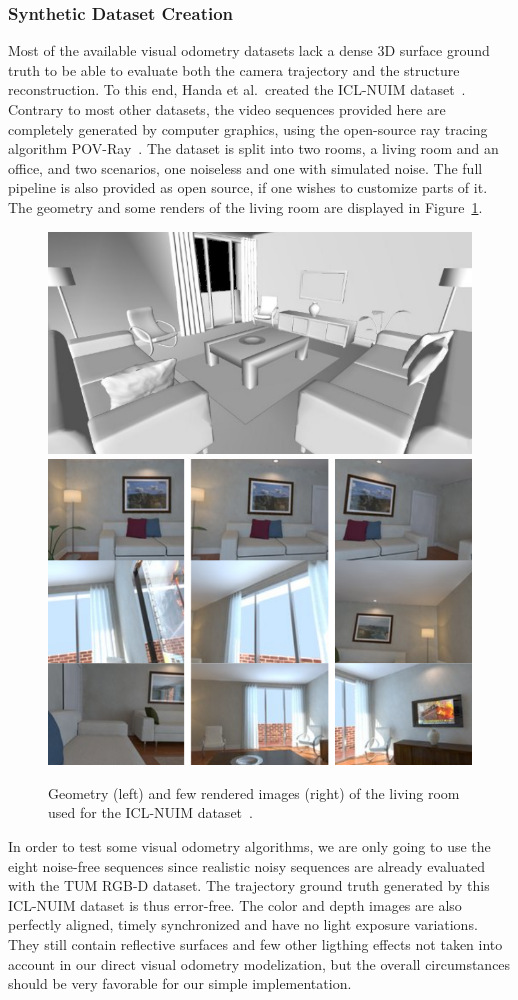 \subsubsection{Synthetic Dataset Creation}%
\label{ssub:synthetic_dataset}

Most of the available visual odometry datasets lack a dense 3D surface ground truth
to be able to evaluate both the camera trajectory and the structure reconstruction.
To this end, Handa et al.\ created the ICL-NUIM dataset~\cite{handa2014benchmark}.
Contrary to most other datasets, the video sequences provided here are completely
generated by computer graphics, using the open-source ray tracing algorithm
POV-Ray~\cite{povray}.
The dataset is split into two rooms, a living room and an office,
and two scenarios, one noiseless and one with simulated noise.
The full pipeline is also provided as open source,
if one wishes to customize parts of it.
The geometry and some renders of the living room are displayed in Figure~\ref{fig:icl-nuim}.

\begin{figure}[t]
	\centering
	\includegraphics[height=0.3\linewidth]{assets/img/icl-nuim-geometry.png}
	\hfill
	\includegraphics[height=0.3\linewidth]{assets/img/icl-nuim-povray.png}
	\caption{Geometry (left) and few rendered images (right)
	of the living room used for the ICL-NUIM dataset~\cite{handa2014benchmark}.}%
	\label{fig:icl-nuim}
\end{figure}

In order to test some visual odometry algorithms,
we are only going to use the eight noise-free sequences since realistic noisy sequences
are already evaluated with the TUM RGB-D dataset.
The trajectory ground truth generated by this ICL-NUIM dataset is thus error-free.
The color and depth images are also perfectly aligned,
timely synchronized and have no light exposure variations.
They still contain reflective surfaces and few other ligthing effects
not taken into account in our direct visual odometry modelization,
but the overall circumstances should be very favorable for our simple implementation.

